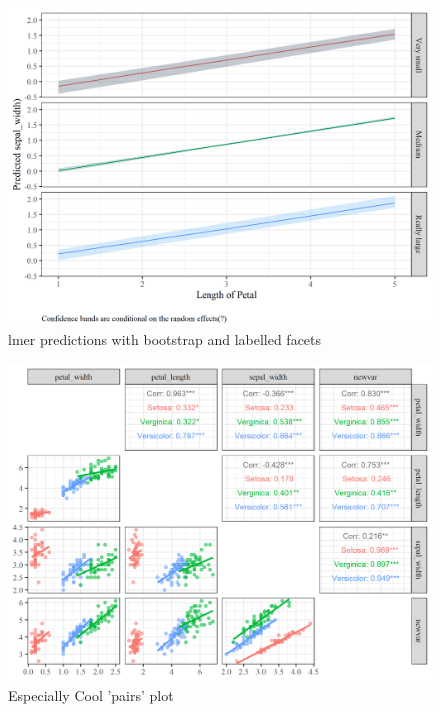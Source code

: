 \documentclass[
]{article}
\begin{document}
\begin{figure}[H]

{\centering \includegraphics[width=0.9\linewidth]{cookbook_files/figure-latex/lmer_predictions-1} 

}

\caption{lmer predictions with bootstrap and labelled facets}\label{fig:lmer_predictions}
\end{figure}

\begin{figure}[H]

{\centering \includegraphics[width=0.9\linewidth]{cookbook_files/figure-latex/ggpairs_plot-1} 

}

\caption{Especially Cool 'pairs' plot}\label{fig:ggpairs_plot}
\end{figure}

\FloatBarrier
\newpage
\end{document}
